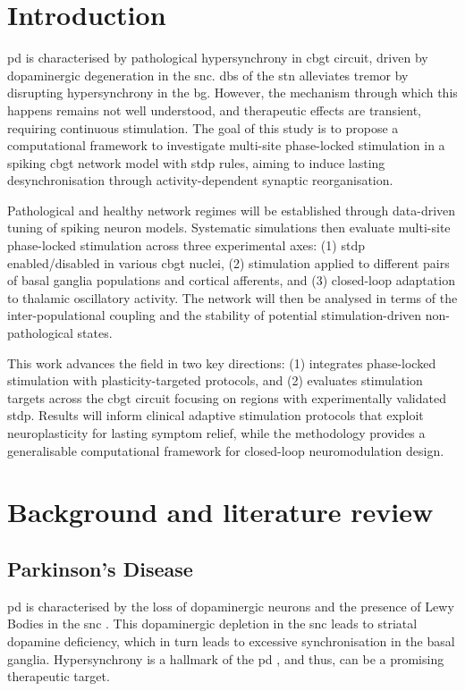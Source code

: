 \newpage
{}
\setcounter{page}{1}

\section{Introduction}
\acrfull{pd} is characterised by pathological hypersynchrony in \acrfull{cbgt} circuit, driven by
dopaminergic degeneration in the \acrfull{snc}.
\acrlong{dbs} of the \acrfull{stn} alleviates tremor by disrupting
hypersynchrony in the \acrfull{bg}.
However, the mechanism through which this happens remains not well understood, and therapeutic effects are transient,
requiring continuous stimulation.
The goal of this study is to propose a computational framework to investigate multi-site phase-locked stimulation in a
spiking \acrshort{cbgt} network model with \acrfull{stdp} rules, aiming to induce lasting desynchronisation
through activity-dependent synaptic reorganisation.

Pathological and healthy network regimes will be established through data-driven tuning of spiking
neuron models.
Systematic simulations then evaluate multi-site phase-locked stimulation across three experimental axes:
(1) \acrshort{stdp} enabled/disabled in various \acrshort{cbgt} nuclei,
(2) stimulation applied to different pairs of basal ganglia populations and cortical afferents, and
(3) closed-loop adaptation to thalamic oscillatory activity.
The network will then be analysed in terms of the inter-populational coupling and the stability of potential
stimulation-driven non-pathological states.

This work advances the field in two key directions:
(1) integrates phase-locked stimulation with plasticity-targeted protocols, and
(2) evaluates stimulation targets across the \acrshort{cbgt} circuit focusing on regions with experimentally validated \acrshort{stdp}.
Results will inform clinical adaptive stimulation protocols that exploit neuroplasticity for lasting symptom relief,
while the methodology provides a generalisable computational framework for closed-loop neuromodulation design.

\section{Background and literature review}

\subsection{Parkinson's Disease}
\acrshort{pd} is characterised by the loss of dopaminergic neurons and the presence of
Lewy Bodies in the \acrshort{snc} \cite{del2018advances}. This dopaminergic depletion in the \acrshort{snc} leads to striatal dopamine
deficiency, which in turn leads to excessive synchronisation in the basal ganglia.
Hypersynchrony is a hallmark of the \acrshort{pd} \cite{hammond2007pathological, helmich2012cerebral},
and thus, can be a promising therapeutic target.


